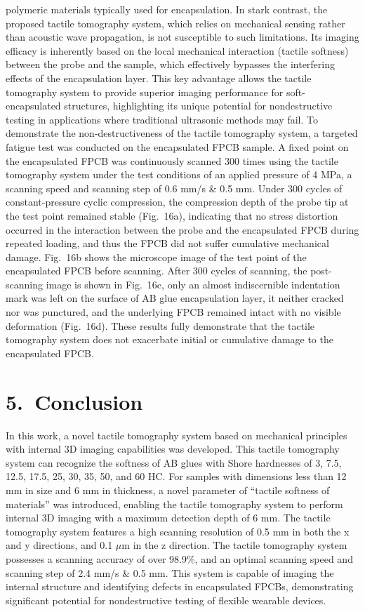 \documentclass[11pt]{article}
\begin{document}
polymeric materials typically used for encapsulation. In stark
contrast, the proposed tactile tomography system, which relies on
mechanical sensing rather than acoustic wave propagation, is not
susceptible to such limitations. Its imaging efficacy is inherently
based on the local mechanical interaction (tactile softness)
between the probe and the sample, which effectively bypasses the
interfering effects of the encapsulation layer. This key advantage
allows the tactile tomography system to provide superior imaging
performance for soft-encapsulated structures, highlighting its
unique potential for nondestructive testing in applications where
traditional ultrasonic methods may fail. To demonstrate the
non-destructiveness of the tactile tomography system, a targeted
fatigue test was conducted on the encapsulated FPCB sample. A fixed
point on the encapsulated FPCB was continuously scanned 300 times
using the tactile tomography system under the test conditions of
an applied pressure of 4 MPa, a scanning speed and scanning step
of 0.6 mm/s \& 0.5 mm. Under 300 cycles of constant-pressure
cyclic compression, the compression depth of the probe tip at the
test point remained stable (Fig.~16a), indicating that no stress
distortion occurred in the interaction between the probe and the
encapsulated FPCB during repeated loading, and thus the FPCB did
not suffer cumulative mechanical damage. Fig.~16b shows the
microscope image of the test point of the encapsulated FPCB before
scanning. After 300 cycles of scanning, the post-scanning image is
shown in Fig.~16c, only an almost indiscernible indentation mark
was left on the surface of AB glue encapsulation layer, it neither
cracked nor was punctured, and the underlying FPCB remained intact
with no visible deformation (Fig.~16d). These results fully
demonstrate that the tactile tomography system does not exacerbate
initial or cumulative damage to the encapsulated FPCB.

\section*{5.\ Conclusion}

In this work, a novel tactile tomography system based on mechanical
principles with internal 3D imaging capabilities was developed.
This tactile tomography system can recognize the softness of AB
glues with Shore hardnesses of 3, 7.5, 12.5, 17.5, 25, 30, 35, 50,
and 60 HC. For samples with dimensions less than 12 mm in size and
6 mm in thickness, a novel parameter of ``tactile softness of
materials'' was introduced, enabling the tactile tomography system
to perform internal 3D imaging with a maximum detection depth of 6
mm. The tactile tomography system features a high scanning
resolution of 0.5 mm in both the x and y directions, and 0.1
$\mu$m in the z direction. The tactile tomography system possesses
a scanning accuracy of over 98.9\%, and an optimal scanning speed
and scanning step of 2.4 mm/s \& 0.5 mm. This system is capable of
imaging the internal structure and identifying defects in
encapsulated FPCBs, demonstrating significant potential for
nondestructive testing of flexible wearable devices.
\end{document}
